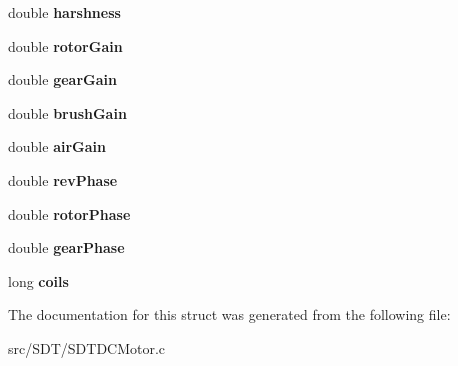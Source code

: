 \begin{DoxyCompactItemize}
\item 
\hypertarget{struct_s_d_t_d_c_motor_a063eb6c03d83c5686b2bb5a56f3fc466}{}double {\bfseries harshness}\label{struct_s_d_t_d_c_motor_a063eb6c03d83c5686b2bb5a56f3fc466}

\item 
\hypertarget{struct_s_d_t_d_c_motor_a1129271e63a92d045d34cb12196b29ee}{}double {\bfseries rotor\+Gain}\label{struct_s_d_t_d_c_motor_a1129271e63a92d045d34cb12196b29ee}

\item 
\hypertarget{struct_s_d_t_d_c_motor_a14572f2e6c6cc3404192eeba192233e1}{}double {\bfseries gear\+Gain}\label{struct_s_d_t_d_c_motor_a14572f2e6c6cc3404192eeba192233e1}

\item 
\hypertarget{struct_s_d_t_d_c_motor_ad812513fdd64170dee31144e59923c49}{}double {\bfseries brush\+Gain}\label{struct_s_d_t_d_c_motor_ad812513fdd64170dee31144e59923c49}

\item 
\hypertarget{struct_s_d_t_d_c_motor_aa21179d3e95b79cd04a718a9ece0b030}{}double {\bfseries air\+Gain}\label{struct_s_d_t_d_c_motor_aa21179d3e95b79cd04a718a9ece0b030}

\item 
\hypertarget{struct_s_d_t_d_c_motor_a7b0b9befe94b3b033acd9b0157d2fa4a}{}double {\bfseries rev\+Phase}\label{struct_s_d_t_d_c_motor_a7b0b9befe94b3b033acd9b0157d2fa4a}

\item 
\hypertarget{struct_s_d_t_d_c_motor_ae05699166c00109353a1966bfe8b6797}{}double {\bfseries rotor\+Phase}\label{struct_s_d_t_d_c_motor_ae05699166c00109353a1966bfe8b6797}

\item 
\hypertarget{struct_s_d_t_d_c_motor_a4c75874432c01aff2850f98781a45cfd}{}double {\bfseries gear\+Phase}\label{struct_s_d_t_d_c_motor_a4c75874432c01aff2850f98781a45cfd}

\item 
\hypertarget{struct_s_d_t_d_c_motor_a672f2bc54f7098c04cdd5a159e7d7b18}{}long {\bfseries coils}\label{struct_s_d_t_d_c_motor_a672f2bc54f7098c04cdd5a159e7d7b18}

\end{DoxyCompactItemize}


The documentation for this struct was generated from the following file\+:\begin{DoxyCompactItemize}
\item 
src/\+S\+D\+T/S\+D\+T\+D\+C\+Motor.\+c\end{DoxyCompactItemize}
